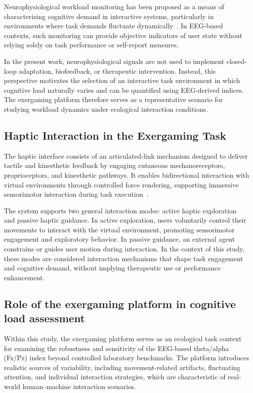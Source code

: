 \documentclass[10pt]{iopart}
\begin{document}
Neurophysiological workload monitoring has been proposed as a means of characterizing cognitive demand in interactive systems, particularly in environments where task demands fluctuate dynamically~\cite{c10}. In EEG-based contexts, such monitoring can provide objective indicators of user state without relying solely on task performance or self-report measures.

In the present work, neurophysiological signals are not used to implement closed-loop adaptation, biofeedback, or therapeutic intervention. Instead, this perspective motivates the selection of an interactive task environment in which cognitive load naturally varies and can be quantified using EEG-derived indices. The exergaming platform therefore serves as a representative scenario for studying workload dynamics under ecological interaction conditions.

\subsection{Haptic Interaction in the Exergaming Task}

The haptic interface consists of an articulated-link mechanism designed to deliver tactile and kinesthetic feedback by engaging cutaneous mechanoreceptors, proprioceptors, and kinesthetic pathways. It enables bidirectional interaction with virtual environments through controlled force rendering, supporting immersive sensorimotor interaction during task execution~\cite{22,23}.

The system supports two general interaction modes: active haptic exploration and passive haptic guidance. In active exploration, users voluntarily control their movements to interact with the virtual environment, promoting sensorimotor engagement and exploratory behavior. In passive guidance, an external agent constrains or guides user motion during interaction. In the context of this study, these modes are considered interaction mechanisms that shape task engagement and cognitive demand, without implying therapeutic use or performance enhancement.



\subsection{Role of the exergaming platform in cognitive load assessment}
Within this study, the exergaming platform serves as an ecological task context for examining the robustness and sensitivity of the EEG-based theta/alpha (Fz/Pz) index beyond controlled laboratory benchmarks. The platform introduces realistic sources of variability, including movement-related artifacts, fluctuating attention, and individual interaction strategies, which are characteristic of real-world human--machine interaction scenarios.
\end{document}
